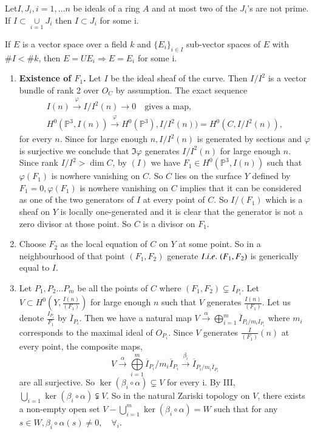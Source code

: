 \medskip
{}
 Let\pageoriginale $I,J_i,i=1,\ldots n$ be ideals of a ring $A$ 
and at most two of the $J_i$'s are not prime. If $I\subset
\underset{i=1}{\cup}J_i$ then $I\subset J_i$ for some i.

\medskip
{}
If $E$ is a vector space over a field $k$ and $\{E_i\}_{i\in I}$
sub-vector spaces of $E$ with $\# I<\# k$, then $E=UE_i\Rightarrow
E=E_i$ for some i.

\begin{enumerate}
\item {\bf Existence of $F_1$.} Let $I$ be the ideal sheaf of the
  curve. Then $I/I^2$ is a vector bundle of rank 2 over $O_C$ by
  assumption. The exact sequence 
\begin{gather*}
I(n)\xrightarrow{\varphi}I/ I^2(n)\longrightarrow 0\quad \text{gives a
map},\\
H^0(\mathbb{P}^3,I(n))\xrightarrow{\varphi}H^0(\mathbb{P}^3),I/I^2(n))
=H^0(C,I/I^2(n)), 
\end{gather*}
for every $n$. Since for large enough $n,I/I^2(n)$ is generated by
sections and $\varphi$ is surjective we conclude that $\Im\varphi$
generates $I/I^2(n)$ for large enough $n$. Since rank $I/I^2>\dim C$,
by $(I)$ we have $F_1\in H^0(\mathbb{P}^3,I(n))$ such that $\varphi
(F_1)$ is nowhere vanishing on $C$. So $C$ lies on the surface $Y$
defined by $F_1=0,\varphi(F_1)$ is nowhere vanishing on $C$ implies
that it can be considered as one of the two generators of $I$ at every
point of $C$. So $I/(F_1)$ which is a sheaf on $Y$ is locally
one-generated and it is clear that the generator is not a zero divisor
at those point. So $C$ is a divisor on $F_1$.
\item Choose $F_2$ as the local equation of $C$ on $Y$ at some
point. So in a neighbourhood of that point $(F_1,F_2)$ generate $I.{i.e.}\kern.3em
(F_1,F_2)$ is generically equal to $I$.

\item Let $P_1,P_2\ldots P_m$ be all the points of $C$ where
$(F_1,F_2)\varsubsetneq I_{P_i}$. Let $V\subset H^0(Y,\frac{I(n)}
{(F_1)})$ for large enough $n$ such that $V$ generates $\frac{I(n)}
{(F_1)}$. Let us denote $\frac{I_{P_i}}{F_1}$ by
$\overline{I}_{P_i}$. Then we have a natural map
$V\xrightarrow{\alpha}\bigoplus\limits_{i=1}^m
\overline{I}_{P_i/m_i{I_{P_i}}}$ where $m_i$ corresponds to the
maximal ideal of $O_{P_i}$. Since $V$ generates $\frac{I}{(F_1)} (n)$
at every point, the composite maps,
$$
V\xrightarrow{\alpha}\bigoplus\limits_{i=1}^m\overline{I}_{P_i}/m_i
\overline{I}_{P_i}\xrightarrow{\beta_i}\overline{I}_{P_i/m_i
{\overline{I}_{P_i}}}
$$\pageoriginale
are all surjective. So $\ker (\beta_i\circ\alpha)\varsubsetneq V$ for
every i. By III,
$\bigcup\limits_{i=1}\ker(\beta_i\circ\alpha)\subsetneqq V$. So in the
natural Zariski topology on $V$, there exists a non-empty open set
$V-\bigcup\limits_{i=1}^m \ker(\beta_i\circ\alpha)=W$ such that for
any $s\in W,\beta_i\circ\alpha(s)\neq 0,\quad\forall_i$.


\end{enumerate}
